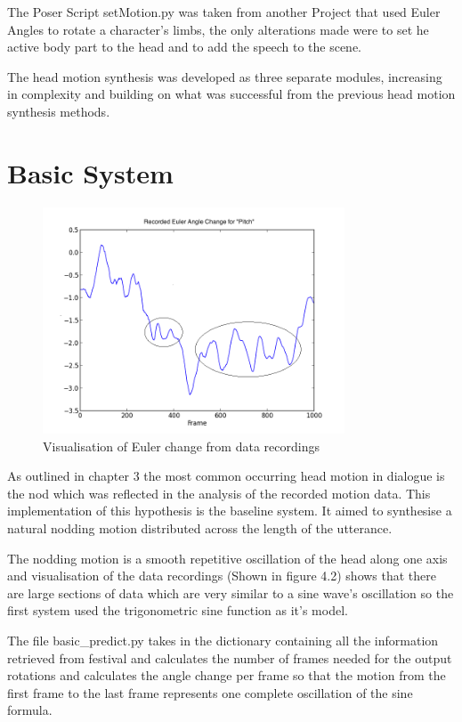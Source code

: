 \documentclass[bsc,frontabs,twoside,singlespacing,parskip,deptreport]{infthesis}
\begin{document}
The Poser Script setMotion.py was taken from another Project that used Euler Angles to rotate a character's limbs, the only alterations made were to set he active body part to the head and to add the speech to the scene.

The head motion synthesis was developed as three separate modules, increasing in complexity and building on what was successful from the previous head motion synthesis methods.

\section{Basic System} 

\begin{figure}
	\centering
	\includegraphics[width=0.8\textwidth]{euler_change.png}
	\caption{Visualisation of Euler change from data recordings}
\end{figure}

As outlined in chapter 3 the most common occurring head motion in dialogue is the nod which was reflected in the analysis of the recorded motion data. This implementation of this hypothesis is the baseline system. It aimed to synthesise a natural nodding motion distributed across the length of the utterance.

The nodding motion is a smooth repetitive oscillation of the head along one axis and visualisation of the data recordings (Shown in figure 4.2) shows that there are large sections of data which are very similar to a sine wave's oscillation so the first system used the trigonometric sine function as it's model.

The file basic\_predict.py takes in the dictionary containing all the information retrieved from festival and calculates the number of frames needed for the output rotations and calculates the angle change per frame so that the motion from the first frame to the last frame represents one complete oscillation of the sine formula.
\end{document}
